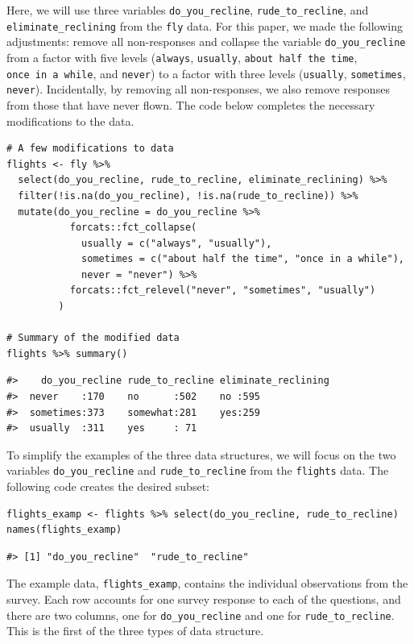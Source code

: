 Here, we will use three variables \texttt{do\_you\_recline}, \texttt{rude\_to\_recline}, and \texttt{eliminate\_reclining} from the \texttt{fly} data. For this paper, we made the following adjustments: remove all non-responses and collapse the variable \texttt{do\_you\_recline} from a factor with five levels (\texttt{always}, \texttt{usually}, \texttt{about\ half\ the\ time}, \texttt{once\ in\ a\ while}, and \texttt{never}) to a factor with three levels (\texttt{usually}, \texttt{sometimes}, \texttt{never}). Incidentally, by removing all non-responses, we also remove responses from those that have never flown. The code below completes the necessary modifications to the data.

\begin{verbatim}
# A few modifications to data
flights <- fly %>% 
  select(do_you_recline, rude_to_recline, eliminate_reclining) %>% 
  filter(!is.na(do_you_recline), !is.na(rude_to_recline)) %>% 
  mutate(do_you_recline = do_you_recline %>% 
           forcats::fct_collapse(
             usually = c("always", "usually"),
             sometimes = c("about half the time", "once in a while"),
             never = "never") %>% 
           forcats::fct_relevel("never", "sometimes", "usually")
         )

# Summary of the modified data
flights %>% summary()
\end{verbatim}

\begin{verbatim}
#>    do_you_recline rude_to_recline eliminate_reclining
#>  never    :170    no      :502    no :595            
#>  sometimes:373    somewhat:281    yes:259            
#>  usually  :311    yes     : 71
\end{verbatim}

To simplify the examples of the three data structures, we will focus on the two variables \texttt{do\_you\_recline} and \texttt{rude\_to\_recline} from the \texttt{flights} data. The following code creates the desired subset:

\begin{verbatim}
flights_examp <- flights %>% select(do_you_recline, rude_to_recline)
names(flights_examp)
\end{verbatim}

\begin{verbatim}
#> [1] "do_you_recline"  "rude_to_recline"
\end{verbatim}

The example data, \texttt{flights\_examp}, contains the individual observations from the survey. Each row accounts for one survey response to each of the questions, and there are two columns, one for \texttt{do\_you\_recline} and one for \texttt{rude\_to\_recline}. This is the first of the three types of data structure.

